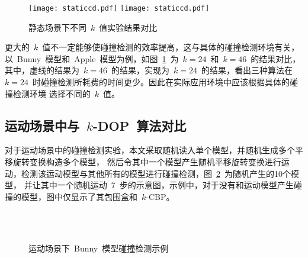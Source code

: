 \begin{figure}[H] 
\centering
{}
{  
   \texttt{[image: staticcd.pdf]}
}
{  
    \texttt{[image: staticcd.pdf]}
}
\caption{静态场景下不同~$k$~值实验结果对比}
\label{fig:chart:exp:kdop:kcbp:k24:k46}
\end{figure}
更大的~$k$~值不一定能够使碰撞检测的效率提高，这与具体的碰撞检测环境有关，以~Bunny~模型和~Apple~模型为例，如图~\ref{fig:chart:exp:kdop:kcbp:k24:k46}~为~$k=24$~和~$k=46$~的结果对比，
其中，虚线的结果为~$k=46$~的结果，实现为~$k=24$~的结果，看出三种算法在~$k=24$~时碰撞检测所耗费的时间更少。因此在实际应用环境中应该根据具体的碰撞检测环境
选择不同的~$k$~值。

\subsection{运动场景中与~$k$-DOP~算法对比}
\label{subsec:exper:kdop:kcbp:dynamic}

对于运动场景中的碰撞检测实验，本文采取随机读入单个模型，并随机生成多个平移旋转变换构造多个模型，
然后令其中一个模型产生随机平移旋转变换进行运动，检测该运动模型与其他所有的模型进行碰撞检测，图~\ref{fig:dynamic:cd:bunny}~为随机产生的10个模型，
并让其中一个随机运动~7~步的示意图，示例中，对于没有和运动模型产生碰撞的模型，图中仅显示了其包围盒和~$k$-CBP。

\begin{figure}[H]
\centering
{} 
\\ 
\\
\caption{运动场景下~Bunny~模型碰撞检测示例}
\label{fig:dynamic:cd:bunny}
\end{figure}

